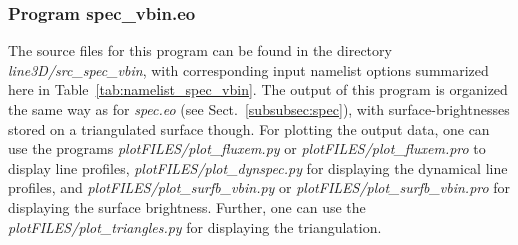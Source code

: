 \documentclass[10pt,a4paper]{article}
\begin{document}
\subsubsection{Program spec\_vbin.eo}
The source files for this program can be found in the directory
\textit{line3D/src\_spec\_vbin}, with corresponding input namelist
options summarized here in Table~\ref{tab:namelist_spec_vbin}. The
output of this program is organized the same way as for
\textit{spec.eo} (see Sect.~\ref{subsubsec:spec}), with
surface-brightnesses stored on a triangulated surface though.
For plotting the output data, one can use the programs
\textit{plotFILES/plot\_fluxem.py} or
\textit{plotFILES/plot\_fluxem.pro} to display line profiles,
\textit{plotFILES/plot\_dynspec.py} for displaying the dynamical line
profiles, and \textit{plotFILES/plot\_surfb\_vbin.py} or
\textit{plotFILES/plot\_surfb\_vbin.pro} for displaying the surface
brightness. Further, one can use the
\textit{plotFILES/plot\_triangles.py} for displaying the
triangulation.
%
%
%
\end{document}
